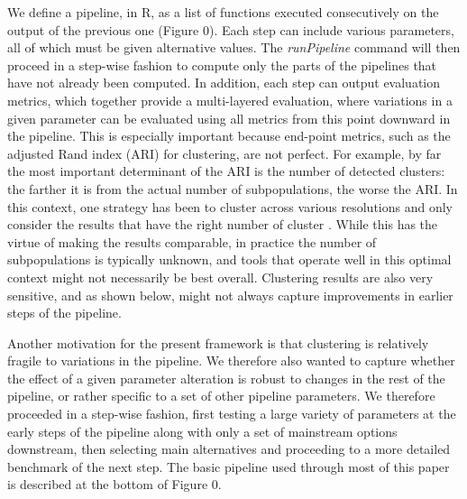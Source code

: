 \documentclass{bmcart}
\begin{document}
We define a pipeline, in R, as a list of functions executed consecutively on the output of the previous one (Figure 0). Each step can include various parameters, all of which must be given alternative values. The \textit{runPipeline} command will then proceed in a step-wise fashion to compute only the parts of the pipelines that have not already been computed. In addition, each step can output evaluation metrics, which together provide a multi-layered evaluation, where variations in a given parameter can be evaluated using all metrics from this point downward in the pipeline. This is especially important because end-point metrics, such as the adjusted Rand index (ARI) for clustering, are not perfect. For example, by far the most important determinant of the ARI is the number of detected clusters: the farther it is from the actual number of subpopulations, the worse the ARI. In this context, one strategy has been to cluster across various resolutions and only consider the results that have the right number of cluster \citep{duoClustering2018}. While this has the virtue of making the results comparable, in practice the number of subpopulations is typically unknown, and tools that operate well in this optimal context might not necessarily be best overall. Clustering results are also very sensitive, and as shown below, might not always capture improvements in earlier steps of the pipeline.

Another motivation for the present framework is that clustering is relatively fragile to variations in the pipeline. We therefore also wanted to capture whether the effect of a given parameter alteration is robust to changes in the rest of the pipeline, or rather specific to a set of other pipeline parameters. We therefore proceeded in a step-wise fashion, first testing a large variety of parameters at the early steps of the pipeline along with only a set of mainstream options downstream, then selecting main alternatives and proceeding to a more detailed benchmark of the next step. The basic pipeline used through most of this paper is described at the bottom of Figure 0.
\end{document}
